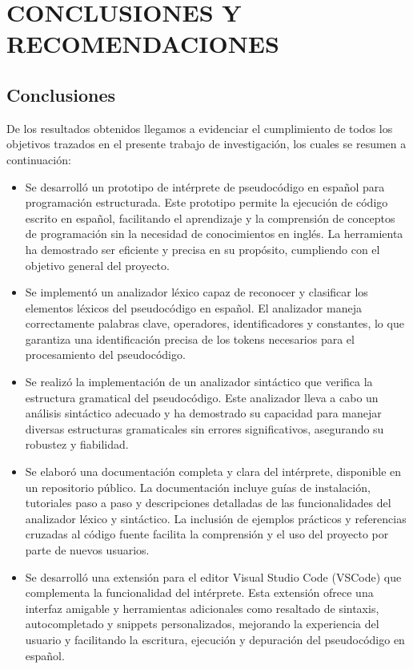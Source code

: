 \chapter{CONCLUSIONES Y RECOMENDACIONES}

\section{Conclusiones}
De los resultados obtenidos llegamos a evidenciar el cumplimiento de todos los objetivos trazados en el presente trabajo de investigación, los cuales se resumen a continuación:
\begin{itemize}
  \item Se desarrolló un prototipo de intérprete de pseudocódigo en español para programación estructurada. Este prototipo permite la ejecución de código escrito en español, facilitando el aprendizaje y la comprensión de conceptos de programación sin la necesidad de conocimientos en inglés. La herramienta ha demostrado ser eficiente y precisa en su propósito, cumpliendo con el objetivo general del proyecto.
  \item Se implementó un analizador léxico capaz de reconocer y clasificar los elementos léxicos del pseudocódigo en español. El analizador maneja correctamente palabras clave, operadores, identificadores y constantes, lo que garantiza una identificación precisa de los tokens necesarios para el procesamiento del pseudocódigo.
  \item Se realizó la implementación de un analizador sintáctico que verifica la estructura gramatical del pseudocódigo. Este analizador lleva a cabo un análisis sintáctico adecuado y ha demostrado su capacidad para manejar diversas estructuras gramaticales sin errores significativos, asegurando su robustez y fiabilidad.
  \item Se elaboró una documentación completa y clara del intérprete, disponible en un repositorio público. La documentación incluye guías de instalación, tutoriales paso a paso y descripciones detalladas de las funcionalidades del analizador léxico y sintáctico. La inclusión de ejemplos prácticos y referencias cruzadas al código fuente facilita la comprensión y el uso del proyecto por parte de nuevos usuarios.
  \item Se desarrolló una extensión para el editor Visual Studio Code (VSCode) que complementa la funcionalidad del intérprete. Esta extensión ofrece una interfaz amigable y herramientas adicionales como resaltado de sintaxis, autocompletado y snippets personalizados, mejorando la experiencia del usuario y facilitando la escritura, ejecución y depuración del pseudocódigo en español.
\end{itemize}

